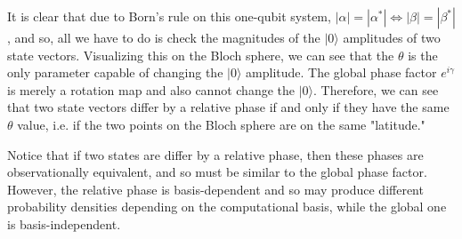 \documentclass{article}
\theoremstyle{definition}
\begin{document}
It is clear that due to Born's rule on this one-qubit system, $|\alpha| = |\alpha^*| \iff |\beta| = |\beta^*|$, and so, all we have to do is check the magnitudes of the $|0\rangle$ amplitudes of two state vectors. Visualizing this on the Bloch sphere, we can see that the $\theta$ is the only parameter capable of changing the $|0\rangle$ amplitude. The global phase factor $e^{i\gamma}$ is merely a rotation map and also cannot change the $|0\rangle$. Therefore, we can see that two state vectors differ by a relative phase if and only if they have the same $\theta$ value, i.e. if the two points on the Bloch sphere are on the same "latitude."

\begin{center} 
\end{center}

Notice that if two states are differ by a relative phase, then these phases are observationally equivalent, and so must be similar to the global phase factor. However, the relative phase is basis-dependent and so may produce different probability densities depending on the computational basis, while the global one is basis-independent. 
\end{document}
